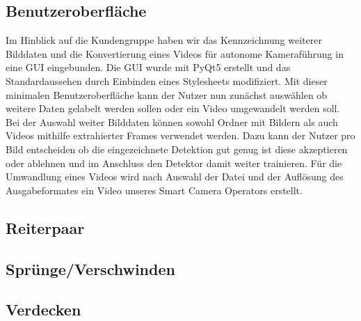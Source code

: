 \subsection*{Benutzeroberfläche}

Im Hinblick auf die Kundengruppe haben wir das Kennzeichnung weiterer Bilddaten und die Konvertierung eines Videos für autonome Kameraführung in eine GUI eingebunden. Die GUI wurde mit PyQt5 erstellt und das Standardaussehen durch Einbinden eines Stylesheets modifiziert. Mit dieser minimalen Benutzeroberfläche kann der Nutzer nun zunächst auswählen ob weitere Daten gelabelt werden sollen oder ein Video umgewandelt werden soll. Bei der Auswahl weiter Bilddaten können sowohl Ordner mit Bildern als auch Videos mithilfe extrahierter Frames verwendet werden. Dazu kann der Nutzer pro Bild entscheiden ob die eingezeichnete Detektion gut genug ist diese akzeptieren oder ablehnen und im Anschluss den Detektor damit weiter trainieren. Für die Umwandlung eines Videos wird nach Auswahl der Datei und der Auflösung des Ausgabeformates ein Video unseres Smart Camera Operators erstellt.

\subsection*{Reiterpaar}
\subsection*{Sprünge/Verschwinden}
\subsection*{Verdecken}
